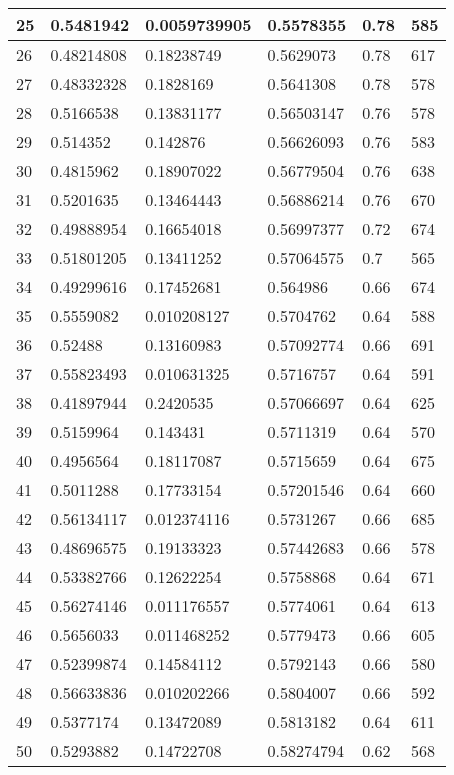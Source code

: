 \begin{longtable}{|l|l|l|l|l|l|}
25 & 0.5481942 & 0.0059739905 & 0.5578355 & 0.78 & 585 \\ \hline 
26 & 0.48214808 & 0.18238749 & 0.5629073 & 0.78 & 617 \\ \hline 
27 & 0.48332328 & 0.1828169 & 0.5641308 & 0.78 & 578 \\ \hline 
28 & 0.5166538 & 0.13831177 & 0.56503147 & 0.76 & 578 \\ \hline 
29 & 0.514352 & 0.142876 & 0.56626093 & 0.76 & 583 \\ \hline 
30 & 0.4815962 & 0.18907022 & 0.56779504 & 0.76 & 638 \\ \hline 
31 & 0.5201635 & 0.13464443 & 0.56886214 & 0.76 & 670 \\ \hline 
32 & 0.49888954 & 0.16654018 & 0.56997377 & 0.72 & 674 \\ \hline 
33 & 0.51801205 & 0.13411252 & 0.57064575 & 0.7 & 565 \\ \hline 
34 & 0.49299616 & 0.17452681 & 0.564986 & 0.66 & 674 \\ \hline 
35 & 0.5559082 & 0.010208127 & 0.5704762 & 0.64 & 588 \\ \hline 
36 & 0.52488 & 0.13160983 & 0.57092774 & 0.66 & 691 \\ \hline 
37 & 0.55823493 & 0.010631325 & 0.5716757 & 0.64 & 591 \\ \hline 
38 & 0.41897944 & 0.2420535 & 0.57066697 & 0.64 & 625 \\ \hline 
39 & 0.5159964 & 0.143431 & 0.5711319 & 0.64 & 570 \\ \hline 
40 & 0.4956564 & 0.18117087 & 0.5715659 & 0.64 & 675 \\ \hline 
41 & 0.5011288 & 0.17733154 & 0.57201546 & 0.64 & 660 \\ \hline 
42 & 0.56134117 & 0.012374116 & 0.5731267 & 0.66 & 685 \\ \hline 
43 & 0.48696575 & 0.19133323 & 0.57442683 & 0.66 & 578 \\ \hline 
44 & 0.53382766 & 0.12622254 & 0.5758868 & 0.64 & 671 \\ \hline 
45 & 0.56274146 & 0.011176557 & 0.5774061 & 0.64 & 613 \\ \hline 
46 & 0.5656033 & 0.011468252 & 0.5779473 & 0.66 & 605 \\ \hline 
47 & 0.52399874 & 0.14584112 & 0.5792143 & 0.66 & 580 \\ \hline 
48 & 0.56633836 & 0.010202266 & 0.5804007 & 0.66 & 592 \\ \hline 
49 & 0.5377174 & 0.13472089 & 0.5813182 & 0.64 & 611 \\ \hline 
50 & 0.5293882 & 0.14722708 & 0.58274794 & 0.62 & 568 \\ \hline 
\end{longtable}